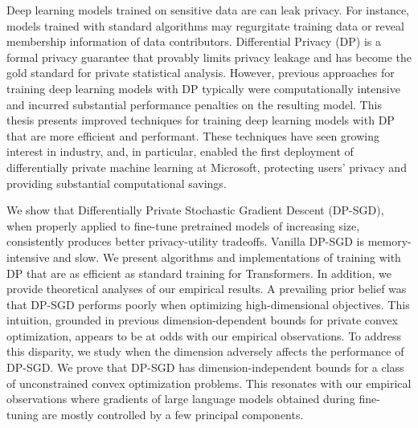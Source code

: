 
Deep learning models trained on sensitive data are can leak privacy.
For instance, models trained with standard algorithms may regurgitate training data or reveal membership information of data contributors.
Differential Privacy (DP) is a formal privacy guarantee that provably limits privacy leakage and has become the gold standard for private statistical analysis.
However, previous approaches for training deep learning models with DP typically were computationally intensive and incurred substantial performance penalties on the resulting model.
This thesis presents improved techniques for training deep learning models with DP that are more efficient and performant.
These techniques have seen growing interest in industry, and, in particular, enabled the first deployment of differentially private machine learning at Microsoft, protecting users' privacy and providing substantial computational savings.

We show that Differentially Private Stochastic Gradient Descent (DP-SGD), when properly applied to fine-tune pretrained models of increasing size, consistently produces better privacy-utility tradeoffs. Vanilla DP-SGD is memory-intensive and slow. We present algorithms and implementations of training with DP that are as efficient as standard training for Transformers.
In addition, we provide theoretical analyses of our empirical results.
A prevailing prior belief was that DP-SGD performs poorly when optimizing high-dimensional objectives. 
This intuition, grounded in previous dimension-dependent bounds for private convex optimization, appears to be at odds with our empirical observations. 
To address this disparity, we study when the dimension adversely affects the performance of DP-SGD. 
We prove that DP-SGD has dimension-independent bounds for a class of unconstrained convex optimization problems. 
This resonates with our empirical observations where gradients of large language models obtained during fine-tuning are mostly controlled by a few principal components.
